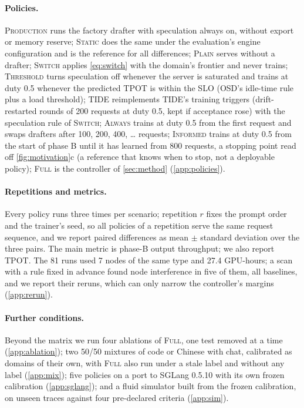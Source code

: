 \documentclass{article}
\newcommand{\pol}[1]{\textsc{#1}}
\begin{document}
\paragraph{Policies.} \pol{Production} runs the factory drafter with speculation always on, without export or memory reserve; \pol{Static} does the same under the evaluation's engine configuration and is the reference for all differences; \pol{Plain} serves without a drafter; \pol{Switch} applies \cref{eq:switch} with the domain's frontier and never trains; \pol{Threshold} turns speculation off whenever the server is saturated and trains at duty 0.5 whenever the predicted TPOT is within the SLO (OSD's idle-time rule \citep{liu2024osd} plus a load threshold); \pol{TIDE} reimplements TIDE's training triggers \citep{park2026tide} (drift-restarted rounds of 200 requests at duty 0.5, kept if acceptance rose) with the speculation rule of \pol{Switch}; \pol{Always} trains at duty 0.5 from the first request and swaps drafters after 100, 200, 400, \dots{} requests; \pol{Informed} trains at duty 0.5 from the start of phase B until it has learned from 800 requests, a stopping point read off \cref{fig:motivation}c (a reference that knows when to stop, not a deployable policy); \pol{Full} is the controller of \cref{sec:method} (\cref{app:policies}).

\paragraph{Repetitions and metrics.} Every policy runs three times per scenario; repetition $r$ fixes the prompt order and the trainer's seed, so all policies of a repetition serve the same request sequence, and we report paired differences as mean $\pm$ standard deviation over the three pairs. The main metric is phase-B output throughput; we also report TPOT. The 81 runs used 7 nodes of the same type and 27.4 GPU-hours; a scan with a rule fixed in advance found node interference in five of them, all baselines, and we report their reruns, which can only narrow the controller's margins (\cref{app:rerun}).

\paragraph{Further conditions.} Beyond the matrix we run four ablations of \pol{Full}, one test removed at a time (\cref{app:ablation}); two 50/50 mixtures of code or Chinese with chat, calibrated as domains of their own, with \pol{Full} also run under a stale label and without any label (\cref{app:mix}); five policies on a port to SGLang 0.5.10 with its own frozen calibration (\cref{app:sglang}); and a fluid simulator built from the frozen calibration, on unseen traces against four pre-declared criteria (\cref{app:sim}).
\end{document}
